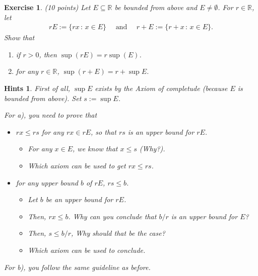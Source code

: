 \documentclass[12pt]{article}
\newcommand{\bR}{\mathbb{R}}
\newcommand{\bN}{\mathbb{N}}
\theoremstyle{plain}
\newtheorem{exer}{\textbf{Exercise}}}
\theoremstyle{plain}
\theoremstyle{plain}
\theoremstyle{plain}
\newtheorem*{hint}{\textbf{Hints}}}
\begin{document}

\begin{exer}
(10 points)
Let $E \subseteq \bR$ be bounded from above and $E \neq \emptyset$. For $r \in \bR$, let
	\begin{align*}
	rE := \{ rx \, : \, x \in E \} \quad \text{ and } \quad r + E := \{ r + x \, : \, x \in E \} .
	\end{align*}
Show that
	\begin{enumerate}[label=\textbf{\alph*)}]
	\item if $r > 0$, then $\sup (r E) = r \sup (E)$.
	\item for any $r \in \bR$, $\sup (r + E) = r + \sup E$.
	\end{enumerate}
\end{exer}
\begin{hint}
First of all, $\sup E$ exists by the Axiom of completude (because $E$ is bounded from above). Set $s := \sup E$.

For a), you need to prove that
	\begin{itemize}
	\item $rx \leq rs$ for any $rx \in rE$, so that $rs$ is an upper bound for $rE$.
		\begin{itemize}
		\item For any $x \in E$, we know that $x \leq s$ (Why?).
		\item Which axiom can be used to get $rx \leq rs$. 
		\end{itemize}
	\item for any upper bound $b$ of $rE$, $rs \leq b$.
		\begin{itemize}
		\item Let $b$ be an upper bound for $rE$.
		\item Then, $rx \leq b$. Why can you conclude that $b/r$ is an upper bound for $E$?
		\item Then, $s \leq b/r$, Why should that be the case?
		\item Which axiom can be used to conclude.
		\end{itemize}
	\end{itemize}
	
For b), you follow the same guideline as before.
\end{hint}
\end{document}
